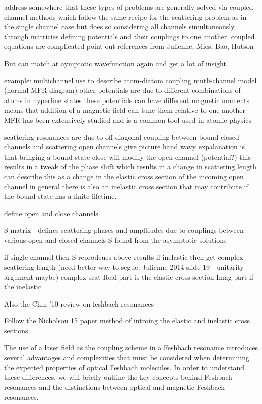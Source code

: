 address somewhere that these types of problems are generally solved via coupled-channel methods which follow the same recipe for the scattering problem as in the single channel case but does so considering all channels simultaneously through matricies defining potentials and their couplings to one another.
coupled equations are complicated
	point out references from Julienne, Mies, Bao, Hutson
	
But can match at aymptotic wavefunction again and get a lot of insight
	
example: multichannel use to describe atom-diatom coupling
	mutli-channel model (normal MFR diagram)
		other potentials are due to different combinations of atoms in hyperfine states
	these potentials can have different magnetic moments
		means that addition of a magnetic field can tune them relative to one another
MFR has been extensively studied and is a common tool used in atomic physics
	
scattering resonances are due to off diagonal coupling between bound closed channels and scattering open channels
	give picture
hand wavy expalanation is that bringing a bound state close will modify the open channel (potential?)
	this results in a tweak of the phase shift which results in a change in scattering length
can describe this as a change in the elastic cross section of the incoming open channel
in general there is also an inelastic cross section that may contribute if the bound state has a finite lifetime.
	
define open and close channels		

S matrix - defines scattering phases and ampltiudes due to couplings between various open and closed channels
	S found from the asymptotic solutions

if single channel then S reprodcues above results
if inelastic then get complex scattering length (need better way to segue, Julienne 2014 slide 19 - unitarity argument maybe)
complex scat
	Real part is the elastic cross section
	Imag part if the inelastic



Also the Chin '10 review on feshbach resonances

Follow the Nicholson 15 paper method of introing the elastic and inelastic cross sections

The use of a laser field as the coupling scheme in a Feshbach resonance introduces several advantages and complexities that must be considered when determining the expected properties of optical Feshbach molecules. In order to understand these differences, we will briefly outline the key concepts behind Feshbach resonances and the distinctions between optical and magnetic Feshbach resonances.


